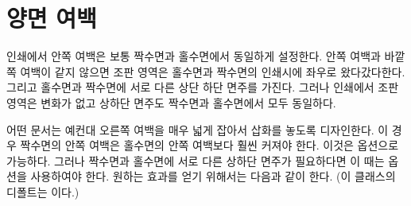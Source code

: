 \section{양면 여백}

 인쇄에서 안쪽 여백은 보통 짝수면과 홀수면에서 동일하게 설정한다.
안쪽 여백과 바깥쪽 여백이 같지 않으면 조판 영역은 홀수면과 짝수면의 인쇄시에
좌우로 왔다갔다한다. 그리고 홀수면과 짝수면에 서로 다른 상단 하단 면주를 가진다.
그러나  인쇄에서 조판 영역은 변화가 없고 상하단 면주도 짝수면과 홀수면에서 모두 동일하다.

어떤 문서는 예컨대 오른쪽 여백을 매우 넓게 잡아서 삽화를 놓도록 디자인한다.
이 경우 짝수면의 안쪽 여백은 홀수면의 안쪽 여백보다 훨씬 커져야 한다.
이것은  옵션으로 가능하다. 그러나 짝수면과 홀수면에
서로 다른 상하단 면주가 필요하다면 이 때는  옵션을
사용하여야 한다. 원하는 효과를 얻기 위해서는 다음과 같이 한다. (이 클래스의
디폴트는 이다.)


